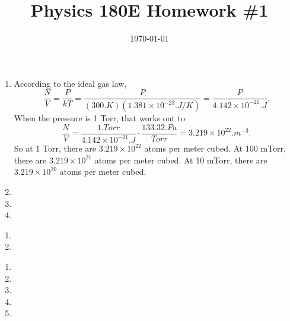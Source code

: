 \documentclass{article}
\date{\today}
\title{Physics 180E Homework \#1}
\begin{document}
\maketitle

\begin{prob}
\end{prob}
\begin{enumerate}[label=(\alph*)]
    \item According to the ideal gas law,
        \[ \frac{N}{V} = \frac{P}{kT} = \frac{P}{\left( 300 \si{.K} \right) \left( 1.381 \times 10^{-23} \si{.J/K} \right)} = \frac{P}{4.142 \times 10^{-21} \si{.J}}. \]
        When the pressure is 1 Torr, that works out to
        \[ \frac{N}{V} = \frac{1 \si{.Torr}}{ 4.142 \times 10^{-21} \si{.J}} \cdot \frac{133.32 \si{.Pa}}{\si{Torr}} = 3.219 \times 10^{22} \si{.m^{-3}}. \]
        So at 1 Torr, there are $3.219 \times 10^{22}$ atoms per meter cubed. At 100 mTorr, there are $3.219 \times 10^{21}$ atoms per meter cubed. At 10 mTorr, there are $3.219 \times 10^{20}$ atoms per meter cubed.
    \item
    \item
    \item
\end{enumerate}


\bigskip
\begin{prob}
\end{prob}
\begin{enumerate}[label=(\alph*)]
    \item
    \item
\end{enumerate}


\bigskip
\begin{prob}
\end{prob}
\begin{enumerate}[label=(\alph*)]
    \item
    \item
    \item
    \item
    \item
\end{enumerate}


\bigskip
\begin{prob}
\end{prob}


\end{document}
